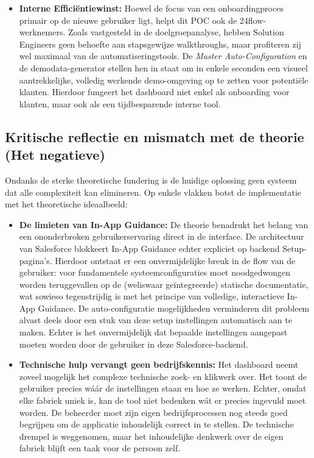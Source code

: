 \begin{itemize}
	\item \textbf{Interne Efficiëntiewinst:} Hoewel de focus van een onboardingproces primair op de nieuwe gebruiker ligt, helpt dit POC ook de 24flow-werknemers. Zoals vastgesteld in de doelgroepanalyse, hebben Solution Engineers geen behoefte aan stapsgewijze walkthroughs, maar profiteren zij wel maximaal van de automatiseringstools. De \textit{Master Auto-Configuration} en de demodata-generator stellen hen in staat om in enkele seconden een visueel aantrekkelijke, volledig werkende demo-omgeving op te zetten voor potentiële klanten. Hierdoor fungeert het dashboard niet enkel als onboarding voor klanten, maar ook als een tijdbesparende interne tool.
\end{itemize}

\subsection{Kritische reflectie en mismatch met de theorie (Het negatieve)}
Ondanks de sterke theoretische fundering is de huidige oplossing geen systeem dat alle complexiteit kan elimineren. Op enkele vlakken botst de implementatie met het theoretische ideaalbeeld:

\begin{itemize}
	\item \textbf{De limieten van In-App Guidance:} De theorie benadrukt het belang van een ononderbroken gebruikerservaring direct in de interface. De architectuur van Salesforce blokkeert In-App Guidance echter expliciet op backend Setup-pagina's. Hierdoor ontstaat er een onvermijdelijke breuk in de flow van de gebruiker: voor fundamentele systeemconfiguraties moet noodgedwongen worden teruggevallen op de (weliswaar geïntegreerde) statische documentatie, wat sowieso tegenstrijdig is met het principe van volledige, interactieve In-App Guidance. De auto-configuratie mogelijkheden verminderen dit probleem alvast deels door een stuk van deze setup instellingen automatisch aan te maken. Echter is het onvermijdelijk dat bepaalde instellingen aangepast moeten worden door de gebruiker in deze Salesforce-backend.
	
	\item \textbf{Technische hulp vervangt geen bedrijfskennis:} Het dashboard neemt zoveel mogelijk het complexe technische zoek- en klikwerk over. Het toont de gebruiker precies wáár de instellingen staan en hoe ze werken. Echter, omdat elke fabriek uniek is, kan de tool niet bedenken wát er precies ingevuld moet worden. De beheerder moet zijn eigen bedrijfsprocessen nog steeds goed begrijpen om de applicatie inhoudelijk correct in te stellen. De technische drempel is weggenomen, maar het inhoudelijke denkwerk over de eigen fabriek blijft een taak voor de persoon zelf.
\end{itemize}

